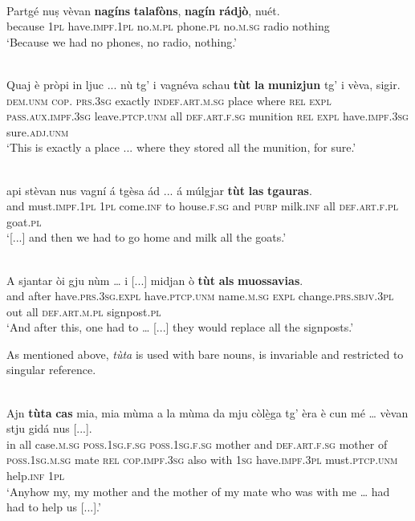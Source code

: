 \ea

\\
\gll Partgé nuṣ vèvan \textbf{nagíns} \textbf{talafòns}, \textbf{nagín} \textbf{rádjò}, nuét.\\
because \textsc{1pl} have.\textsc{impf.1pl} no.\textsc{m.pl} phone.\textsc{pl} no.\textsc{m.sg} radio nothing\\
\glt `Because we had no phones, no radio, nothing.'
\z

\ea

\\
\gll  Quaj è pròpi in ljuc ... nù tg’ i vagnéva schau \textbf{tùt} \textbf{la} \textbf{munizjun} tg’ i vèva, sigir.\\
\textsc{dem.unm} \textsc{cop. prs.3sg} exactly \textsc{indef.art.m.sg} place {} where \textsc{rel} \textsc{expl} \textsc{pass.aux.impf.3sg} leave.\textsc{ptcp.unm} all \textsc{def.art.f.sg} munition \textsc{rel} \textsc{expl} have.\textsc{impf.3sg} sure.\textsc{adj.unm}\\
\glt `This is exactly a place ... where they stored all the munition, for sure.'
\z

\ea
{}\\
\gll  [...] api stèvan nus vagní á tgèsa ád ... á múlgjar \textbf{tùt} \textbf{las} \textbf{tgauras}.\\
{} and must.\textsc{impf.1pl} \textsc{1pl} come.\textsc{inf} to house.\textsc{f.sg} and {} \textsc{purp} milk.\textsc{inf} all \textsc{def.art.f.pl} goat.\textsc{pl}\\
\glt `[...] and then we had to go home and milk all the goats.'
\z

\ea

\\
\gll A sjantar òi gju nùm … i [...] midjan ò \textbf{tùt} \textbf{als} \textbf{muossavias}.\\
and after have.\textsc{prs.3sg.expl} have.\textsc{ptcp.unm} name.\textsc{m.sg} {} \textsc{expl}  {} change.\textsc{prs.sbjv.3pl} out all \textsc{def.art.m.pl} signpost.\textsc{pl}\\
\glt `And after this, one had to … [...] they would replace all the signposts.'
\z

As mentioned above, \textit{tùta} is used with bare nouns, is invariable and restricted to singular reference.

\ea
{}\\
	\gll    Ajn \textbf{tùta} \textbf{cas} mia, mia mùma a la mùma da mju còlè̱ga tg’ èra è cun mé … vèvan stju gidá nus [...].\\
in all case.\textsc{m.sg} \textsc{poss.1sg.f.sg}  \textsc{poss.1sg.f.sg} mother and \textsc{def.art.f.sg} mother of  \textsc{poss.1sg.m.sg} mate \textsc{rel}  \textsc{cop.impf.3sg} also with \textsc{1sg} {}  have.\textsc{impf.3pl} must.\textsc{ptcp.unm} help.\textsc{inf} \textsc{1pl}\\
\glt `Anyhow my, my mother and the mother of my mate who was with me … had had to help us [...].'
\z

